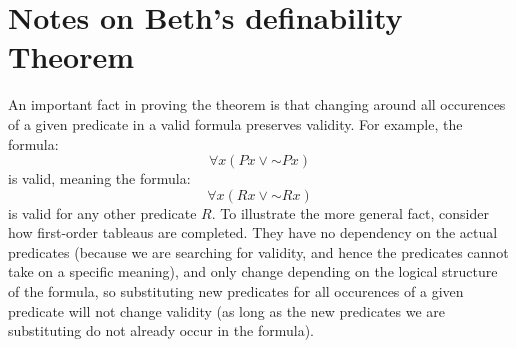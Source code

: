 \documentclass{article}
\newcommand*{\oldneg}{\mathord{\sim}}
\theoremstyle{definition}
\begin{document}
\section*{Notes on Beth's definability Theorem}
An important fact in proving the theorem is that changing around all occurences of a given predicate in a valid formula preserves validity. 
For example, the formula:
\[ \forall x\left(Px\vee \oldneg Px\right) \] is valid, meaning the formula:
\[ \forall x\left(Rx\vee \oldneg Rx\right) \] is valid for any other predicate $R$. To illustrate the more general fact, consider how first-order 
tableaus are completed. They have no dependency on the actual predicates (because we are searching for validity, and hence the predicates cannot take on 
a specific meaning), and only change depending on the logical structure of the formula, so substituting new predicates for all occurences of a 
given predicate will not change validity (as long as the new predicates we are substituting do not already occur in the formula). 
\end{document}

